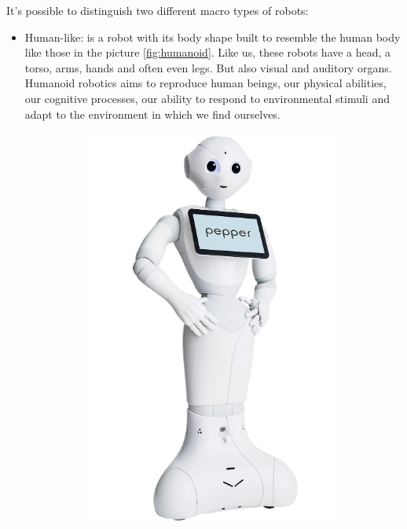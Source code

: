 \documentclass{thesisreport}
\begin{document}
It's possible to distinguish two different macro types of robots:
\begin{itemize}
\item Human-like: is a robot with its body shape built to resemble the human body like those in the picture \ref{fig:humanoid}. Like us, these robots have a head, a torso, arms, hands and often even legs. But also visual and auditory organs. Humanoid robotics aims to reproduce human beings, our physical abilities, our cognitive processes, our ability to respond to environmental stimuli and adapt to the environment in which we find ourselves. 
\begin{figure}[H]
	\centering
	\begin{subfigure}{0.27\textwidth}
	    \includegraphics[width=\textwidth]{Thesis/data/pepper.png}

\end{subfigure}
\end{figure}
\end{itemize}
\end{document}
